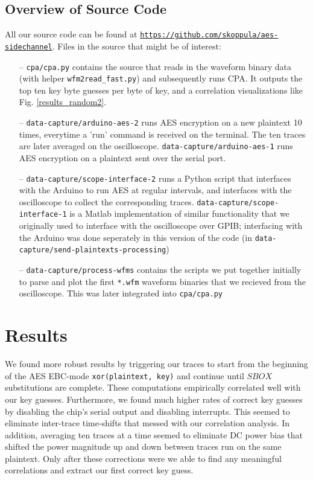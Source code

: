\documentclass[journal]{ieee_style}
\begin{document}
\subsection{Overview of Source Code}
All our source code can be found at \texttt{\url{https://github.com/skoppula/aes-sidechannel}}. Files in the source that might be of interest:
\begin{itemize}
    \item[--] \texttt{cpa/cpa.py} contains the source that reads in the waveform binary data (with helper \texttt{wfm2read\_fast.py}) and subsequently runs CPA. It outputs the top ten key byte guesses per byte of key, and a correlation visualizations like Fig. \ref{results_random2}.
    \item[--] \texttt{data-capture/arduino-aes-2} runs AES encryption on a new plaintext 10 times, everytime a 'run' command is received on the terminal. The ten traces are later averaged on the oscilloscope. \texttt{data-capture/arduino-aes-1} runs AES encryption on a plaintext sent over the serial port.
    \item[--] \texttt{data-capture/scope-interface-2} runs a Python script that interfaces with the Arduino to run AES at regular intervals, and interfaces with the oscilloscope to collect the corresponding traces. \texttt{data-capture/scope-interface-1} is a Matlab implementation of similar functionality that we originally used to interface with the oscilloscope over GPIB; interfacing with the Arduino was done seperately in this version of the code (in \texttt{data-capture/send-plaintexts-processing})
    \item[--] \texttt{data-capture/process-wfms} contains the scripts we put together initially to parse and plot the first \texttt{*.wfm} waveform binaries that we recieved from the oscilloscope. This was later integrated into \texttt{cpa/cpa.py}
\end{itemize}

\section{Results}
We found more robust results by triggering our traces to start from the beginning of the AES EBC-mode \texttt{xor(plaintext, key)} and continue until $SBOX$ substitutions are complete. These computations empirically correlated well with our key guesses. Furthermore, we found much higher rates of correct key guesses by disabling the chip's serial output and disabling interrupts. This seemed to eliminate inter-trace time-shifts that messed with our correlation analysis. In addition, averaging ten traces at a time seemed to eliminate DC power bias that shifted the power magnitude up and down between traces run on the same plaintext. Only after these corrections were we able to find any meaningful correlations and extract our first correct key guess.
\end{document}
